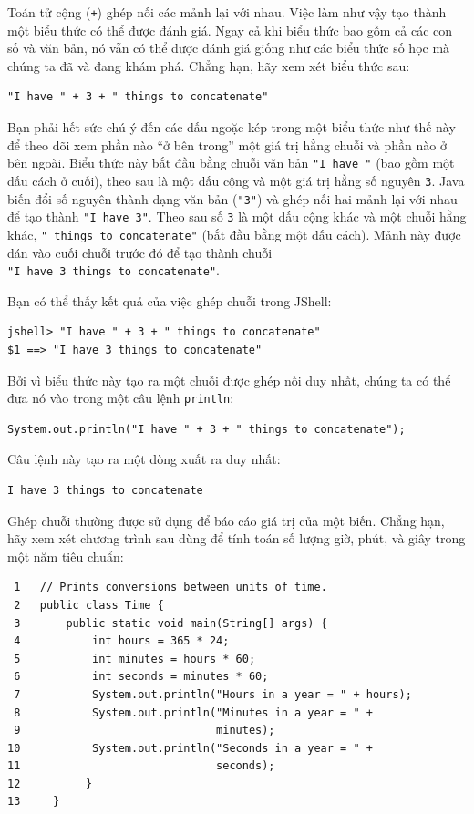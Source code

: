 Toán tử cộng (\texttt{+}) ghép nối các mảnh lại với nhau. Việc làm như
vậy tạo thành một biểu thức có thể được đánh giá. Ngay cả khi biểu thức
bao gồm cả các con số và văn bản, nó vẫn có thể được đánh giá giống như
các biểu thức số học mà chúng ta đã và đang khám phá. Chẳng hạn, hãy xem
xét biểu thức sau:

\begin{verbatim}
"I have " + 3 + " things to concatenate"
\end{verbatim}

Bạn phải hết sức chú ý đến các dấu ngoặc kép trong một biểu thức như thế
này để theo dõi xem phần nào ``ở bên trong'' một giá trị hằng chuỗi và
phần nào ở bên ngoài. Biểu thức này bắt đầu bằng chuỗi văn bản
\texttt{"I\ have\ "} (bao gồm một dấu cách ở cuối), theo sau là một dấu
cộng và một giá trị hằng số nguyên \texttt{3}. Java biến đổi số nguyên
thành dạng văn bản (\texttt{"3"}) và ghép nối hai mảnh lại với nhau để
tạo thành \texttt{"I\ have\ 3"}. Theo sau số \texttt{3} là một dấu cộng
khác và một chuỗi hằng khác, \texttt{"\ things\ to\ concatenate"} (bắt
đầu bằng một dấu cách). Mảnh này được dán vào cuối chuỗi trước đó để tạo
thành chuỗi \texttt{"I\ have\ 3\ things\ to\ concatenate"}.

Bạn có thể thấy kết quả của việc ghép chuỗi trong JShell:

\begin{verbatim}
jshell> "I have " + 3 + " things to concatenate" 
$1 ==> "I have 3 things to concatenate"
\end{verbatim}

Bởi vì biểu thức này tạo ra một chuỗi được ghép nối duy nhất, chúng ta
có thể đưa nó vào trong một câu lệnh \texttt{println}:

\begin{verbatim}
System.out.println("I have " + 3 + " things to concatenate");
\end{verbatim}

Câu lệnh này tạo ra một dòng xuất ra duy nhất:

\begin{verbatim}
I have 3 things to concatenate
\end{verbatim}

Ghép chuỗi thường được sử dụng để báo cáo giá trị của một biến. Chẳng
hạn, hãy xem xét chương trình sau dùng để tính toán số lượng giờ, phút,
và giây trong một năm tiêu chuẩn:

\begin{verbatim}
 1   // Prints conversions between units of time.
 2   public class Time {
 3       public static void main(String[] args) {
 4           int hours = 365 * 24;
 5           int minutes = hours * 60;
 6           int seconds = minutes * 60;
 7           System.out.println("Hours in a year = " + hours);
 8           System.out.println("Minutes in a year = " + 
 9                              minutes);
10           System.out.println("Seconds in a year = " + 
11                              seconds);
12          }
13     }
\end{verbatim}

